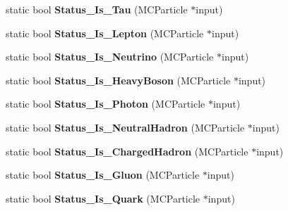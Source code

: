 \begin{DoxyCompactItemize}
\item 
\hypertarget{classToolSet_1_1CMC_afa2d4c47b2fe8348eb11fdd5956cdaa0}{
static bool {\bfseries Status\_\-Is\_\-Tau} (MCParticle $\ast$input)}
\label{classToolSet_1_1CMC_afa2d4c47b2fe8348eb11fdd5956cdaa0}

\item 
\hypertarget{classToolSet_1_1CMC_a23d5636609d812ec8ca6b0d10e69a885}{
static bool {\bfseries Status\_\-Is\_\-Lepton} (MCParticle $\ast$input)}
\label{classToolSet_1_1CMC_a23d5636609d812ec8ca6b0d10e69a885}

\item 
\hypertarget{classToolSet_1_1CMC_ae11398c05dd404fae775c49b0b2a5339}{
static bool {\bfseries Status\_\-Is\_\-Neutrino} (MCParticle $\ast$input)}
\label{classToolSet_1_1CMC_ae11398c05dd404fae775c49b0b2a5339}

\item 
\hypertarget{classToolSet_1_1CMC_aed24e1c551c05989497eca209494b4b7}{
static bool {\bfseries Status\_\-Is\_\-HeavyBoson} (MCParticle $\ast$input)}
\label{classToolSet_1_1CMC_aed24e1c551c05989497eca209494b4b7}

\item 
\hypertarget{classToolSet_1_1CMC_a6d949652a7db0e7e21d88a30174321ba}{
static bool {\bfseries Status\_\-Is\_\-Photon} (MCParticle $\ast$input)}
\label{classToolSet_1_1CMC_a6d949652a7db0e7e21d88a30174321ba}

\item 
\hypertarget{classToolSet_1_1CMC_ac8c420d5b46995cd4c11d10cb70be958}{
static bool {\bfseries Status\_\-Is\_\-NeutralHadron} (MCParticle $\ast$input)}
\label{classToolSet_1_1CMC_ac8c420d5b46995cd4c11d10cb70be958}

\item 
\hypertarget{classToolSet_1_1CMC_a5df6b8b9f816ff8f89c3430ffbcb00ae}{
static bool {\bfseries Status\_\-Is\_\-ChargedHadron} (MCParticle $\ast$input)}
\label{classToolSet_1_1CMC_a5df6b8b9f816ff8f89c3430ffbcb00ae}

\item 
\hypertarget{classToolSet_1_1CMC_a30de4d54169d99c8119e789b4b01d59e}{
static bool {\bfseries Status\_\-Is\_\-Gluon} (MCParticle $\ast$input)}
\label{classToolSet_1_1CMC_a30de4d54169d99c8119e789b4b01d59e}

\item 
\hypertarget{classToolSet_1_1CMC_a86999adb3aa3b4d16de7b0819739b233}{
static bool {\bfseries Status\_\-Is\_\-Quark} (MCParticle $\ast$input)}
\label{classToolSet_1_1CMC_a86999adb3aa3b4d16de7b0819739b233}


\end{DoxyCompactItemize}

